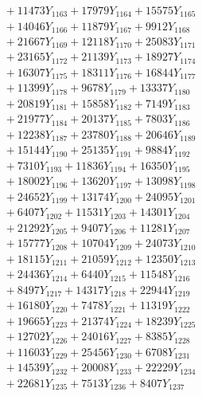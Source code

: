 \documentclass[a4paper,10pt]{article}
\begin{document}
{\begin{align}
&\;  + 11473 Y_{1163} + 17979 Y_{1164} + 15575 Y_{1165} \\[0.3ex]
&\;  + 14046 Y_{1166} + 11879 Y_{1167} + 9912 Y_{1168} \\[0.5ex]\allowbreak
&\;  + 21667 Y_{1169} + 12118 Y_{1170} + 25083 Y_{1171} \\[0.3ex]
&\;  + 23165 Y_{1172} + 21139 Y_{1173} + 18927 Y_{1174} \\[0.3ex]
&\;  + 16307 Y_{1175} + 18311 Y_{1176} + 16844 Y_{1177} \\[0.3ex]
&\;  + 11399 Y_{1178} + 9678 Y_{1179} + 13337 Y_{1180} \\[0.3ex]
&\;  + 20819 Y_{1181} + 15858 Y_{1182} + 7149 Y_{1183} \\[0.3ex]
&\;  + 21977 Y_{1184} + 20137 Y_{1185} + 7803 Y_{1186} \\[0.3ex]
&\;  + 12238 Y_{1187} + 23780 Y_{1188} + 20646 Y_{1189} \\[0.3ex]
&\;  + 15144 Y_{1190} + 25135 Y_{1191} + 9884 Y_{1192} \\[0.3ex]
&\;  + 7310 Y_{1193} + 11836 Y_{1194} + 16350 Y_{1195} \\[0.3ex]
&\;  + 18002 Y_{1196} + 13620 Y_{1197} + 13098 Y_{1198} \\[0.5ex]\allowbreak
&\;  + 24652 Y_{1199} + 13174 Y_{1200} + 24095 Y_{1201} \\[0.3ex]
&\;  + 6407 Y_{1202} + 11531 Y_{1203} + 14301 Y_{1204} \\[0.3ex]
&\;  + 21292 Y_{1205} + 9407 Y_{1206} + 11281 Y_{1207} \\[0.3ex]
&\;  + 15777 Y_{1208} + 10704 Y_{1209} + 24073 Y_{1210} \\[0.3ex]
&\;  + 18115 Y_{1211} + 21059 Y_{1212} + 12350 Y_{1213} \\[0.3ex]
&\;  + 24436 Y_{1214} + 6440 Y_{1215} + 11548 Y_{1216} \\[0.3ex]
&\;  + 8497 Y_{1217} + 14317 Y_{1218} + 22944 Y_{1219} \\[0.3ex]
&\;  + 16180 Y_{1220} + 7478 Y_{1221} + 11319 Y_{1222} \\[0.3ex]
&\;  + 19665 Y_{1223} + 21374 Y_{1224} + 18239 Y_{1225} \\[0.3ex]
&\;  + 12702 Y_{1226} + 24016 Y_{1227} + 8385 Y_{1228} \\[0.5ex]\allowbreak
&\;  + 11603 Y_{1229} + 25456 Y_{1230} + 6708 Y_{1231} \\[0.3ex]
&\;  + 14539 Y_{1232} + 20008 Y_{1233} + 22229 Y_{1234} \\[0.3ex]
&\;  + 22681 Y_{1235} + 7513 Y_{1236} + 8407 Y_{1237} \\[0.3ex]

\end{align}}
\end{document}
